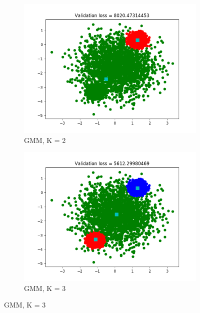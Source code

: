 \documentclass[12pt,letterpaper]{article}
\begin{document}
\begin{figure}
    \begin{subfigure}[b]{0.45\textwidth}
        \includegraphics[width=\textwidth]{imgs/GMM_K_2.png}
        \caption{GMM, K = 2}
        \label{GMM_2}
    \end{subfigure}
    \begin{subfigure}[b]{0.45\textwidth}
        \includegraphics[width=\textwidth]{imgs/GMM_K_3.png}
        \caption{GMM, K = 3}
        \label{GMM_3}
    \end{subfigure}
     

\end{figure}
\end{document}
